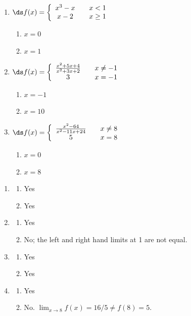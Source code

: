 \begin{enumialphparenastyle}
\begin{ex}
\begin{enumerate}
\item {$\ds f(x) = \left\{\begin{array}{ccc} 
x^3-x		& & x<1\\
x-2 & & x\geq 1
\end{array}\right.
$
\begin{enumerate}
\item		$x=0$
\item		$x=1$
\end{enumerate}
}

\item {$\ds f(x) = \left\{\begin{array}{ccc} 
\frac{x^2+5x+4}{x^2+3x+2}		& &  x\neq -1\\
3 & & x=-1
\end{array}\right.
$
\begin{enumerate}
\item		$x=-1$
\item		$x=10$
\end{enumerate}
}

\item {$\ds f(x) = \left\{\begin{array}{ccc}
\frac{x^2-64}{x^2-11 x+24}		& &  x\neq 8\\
5 & & x=8
\end{array}\right.
$
\begin{enumerate}
\item		$x=0$
\item		$x=8$
\end{enumerate}
}

\end{enumerate}

\begin{sol}
\begin{enumerate}
\item {\begin{enumerate}
\item		Yes
\item		Yes
\end{enumerate}
}
\item {\begin{enumerate}
\item		Yes
\item		No; the left and right hand limits at 1 are not equal.
\end{enumerate}
}
\item {\begin{enumerate}
\item		Yes
\item		Yes
\end{enumerate}
}
\item {\begin{enumerate}
\item		Yes
\item		No. $\lim_{x\to 8} f(x) = 16/5 \neq f(8) = 5$.
\end{enumerate}
}
\end{enumerate}
\end{sol}


\end{ex}
\end{enumialphparenastyle}
